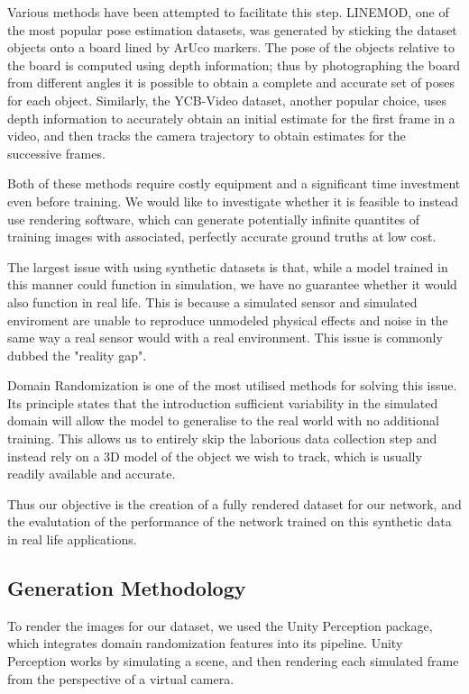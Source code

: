 Various methods have been attempted to facilitate this step. LINEMOD\cite{linemod}, one of the most popular pose estimation datasets, was generated by sticking the dataset objects onto a board lined by ArUco markers. The pose of the objects relative to the board is computed using depth information; thus by photographing the board from different angles it is possible to obtain a complete and accurate set of poses for each object. Similarly, the YCB-Video dataset, another popular choice, uses depth information to accurately obtain an initial estimate for the first frame in a video, and then tracks the camera trajectory to obtain estimates for the successive frames.

Both of these methods require costly equipment and a significant time investment even before training. We would like to investigate whether it is feasible to instead use rendering software, which can generate potentially infinite quantites of training images with associated, perfectly accurate ground truths at low cost.

The largest issue with using synthetic datasets is that, while a model trained in this manner could function in simulation, we have no guarantee whether it would also function in real life. This is because a simulated sensor and simulated enviroment are unable to reproduce unmodeled physical effects and noise in the same way a real sensor would with a real environment. This issue is commonly dubbed the "reality gap"\cite{domainRandomization2}.

Domain Randomization\cite{domainRandomization} is one of the most utilised methods for solving this issue. Its principle states that the introduction sufficient variability in the simulated domain will allow the model to generalise to the real world with no additional training. This allows us to entirely skip the laborious data collection step and instead rely on a 3D model of the object we wish to track, which is usually readily available and accurate.

Thus our objective is the creation of a fully rendered dataset for our network, and the evalutation of the performance of the network trained on this synthetic data in real life applications.

\subsection{Generation Methodology}
\label{ss:ScrewDataset}

To render the images for our dataset, we used the Unity Perception package\cite{unityPerception}, which integrates domain randomization features into its pipeline. Unity Perception works by simulating a scene, and then rendering each simulated frame from the perspective of a virtual camera. 

